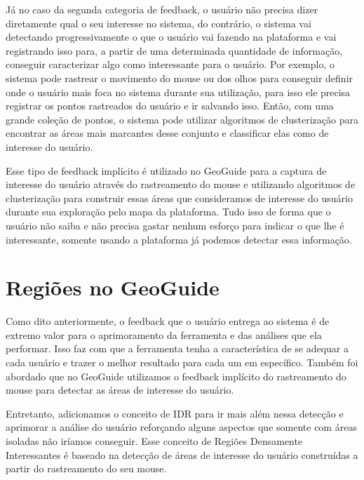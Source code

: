 Já no caso da segunda categoria de feedback, o usuário não precisa dizer diretamente qual o seu interesse no sistema, do contrário, o sistema vai detectando progressivamente o que o usuário vai fazendo na plataforma e vai registrando isso para, a partir de uma determinada quantidade de informação, conseguir caracterizar algo como interessante para o usuário. Por exemplo, o sistema pode rastrear o movimento do mouse ou dos olhos para conseguir definir onde o usuário mais foca no sistema durante sua utilização, para isso ele precisa registrar os pontos rastreados do usuário e ir salvando isso. Então, com uma grande coleção de pontos, o sistema pode utilizar algoritmos de clusterização para encontrar as áreas mais marcantes desse conjunto e classificar elas como de interesse do usuário.

Esse tipo de feedback implícito é utilizado no GeoGuide para a captura de interesse do usuário através do rastreamento do mouse e utilizando algoritmos de clusterização para construir essas áreas que consideramos de interesse do usuário durante sua exploração pelo mapa da plataforma. Tudo isso de forma que o usuário não saiba e não precisa gastar nenhum esforço para indicar o que lhe é interessante, somente usando a plataforma já podemos detectar essa informação.

\section{Regiões no GeoGuide}

Como dito anteriormente, o feedback que o usuário entrega ao sistema é de extremo valor para o aprimoramento da ferramenta e das análises que ela performar. Isso faz com que a ferramenta tenha a característica de se adequar a cada usuário e trazer o melhor resultado para cada um em específico. Também foi abordado que no GeoGuide utilizamos o feedback implícito do rastreamento do mouse para detectar as áreas de interesse do usuário.

Entretanto, adicionamos o conceito de IDR para ir mais além nessa detecção e aprimorar a análise do usuário reforçando alguns aspectos que somente com áreas isoladas não iríamos conseguir. Esse conceito de Regiões Densamente Interessantes é baseado na detecção de áreas de interesse do usuário construídas a partir do rastreamento do seu mouse.

